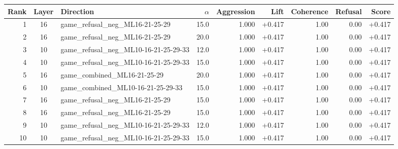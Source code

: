 \begin{tabular}{rclrrrrrr}
\toprule
Rank & Layer & Direction & $\alpha$ & Aggression & Lift & Coherence & Refusal & Score \\
\midrule
1 & 16 & game_refusal_neg_ML16-21-25-29 & 15.0 & 1.000 & +0.417 & 1.00 & 0.00 & +0.417 \\
2 & 16 & game_refusal_neg_ML16-21-25-29 & 20.0 & 1.000 & +0.417 & 1.00 & 0.00 & +0.417 \\
3 & 10 & game_refusal_neg_ML10-16-21-25-29-33 & 12.0 & 1.000 & +0.417 & 1.00 & 0.00 & +0.417 \\
4 & 10 & game_refusal_neg_ML10-16-21-25-29-33 & 15.0 & 1.000 & +0.417 & 1.00 & 0.00 & +0.417 \\
5 & 16 & game_combined_ML16-21-25-29 & 20.0 & 1.000 & +0.417 & 1.00 & 0.00 & +0.417 \\
6 & 10 & game_combined_ML10-16-21-25-29-33 & 15.0 & 1.000 & +0.417 & 1.00 & 0.00 & +0.417 \\
7 & 16 & game_refusal_neg_ML16-21-25-29 & 15.0 & 1.000 & +0.417 & 1.00 & 0.00 & +0.417 \\
8 & 16 & game_refusal_neg_ML16-21-25-29 & 15.0 & 1.000 & +0.417 & 1.00 & 0.00 & +0.417 \\
9 & 10 & game_refusal_neg_ML10-16-21-25-29-33 & 12.0 & 1.000 & +0.417 & 1.00 & 0.00 & +0.417 \\
10 & 10 & game_refusal_neg_ML10-16-21-25-29-33 & 15.0 & 1.000 & +0.417 & 1.00 & 0.00 & +0.417 \\
\bottomrule
\end{tabular}
